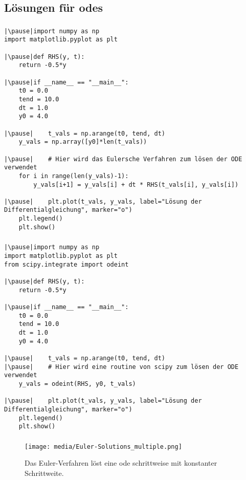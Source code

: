 \subsection{Lösungen für \acsp{ode}}
\label{subsec:solving}
\begin{frame}[fragile]
    \frametitle{\insertsubsection}
    \begin{verbatim}
|\pause|import numpy as np
import matplotlib.pyplot as plt

|\pause|def RHS(y, t):
    return -0.5*y

|\pause|if __name__ == "__main__":
    t0 = 0.0
    tend = 10.0
    dt = 1.0
    y0 = 4.0

|\pause|    t_vals = np.arange(t0, tend, dt)
    y_vals = np.array([y0]*len(t_vals))

|\pause|    # Hier wird das Eulersche Verfahren zum lösen der ODE verwendet
    for i in range(len(y_vals)-1):
        y_vals[i+1] = y_vals[i] + dt * RHS(t_vals[i], y_vals[i])

|\pause|    plt.plot(t_vals, y_vals, label="Lösung der Differentialgleichung", marker="o")
    plt.legend()
    plt.show()
	\end{verbatim}
\end{frame}


\begin{frame}[fragile]
    \frametitle{\insertsubsection}
    \begin{verbatim}
|\pause|import numpy as np
import matplotlib.pyplot as plt
from scipy.integrate import odeint

|\pause|def RHS(y, t):
    return -0.5*y

|\pause|if __name__ == "__main__":
    t0 = 0.0
    tend = 10.0
    dt = 1.0
    y0 = 4.0

|\pause|    t_vals = np.arange(t0, tend, dt)
|\pause|    # Hier wird eine routine von scipy zum lösen der ODE verwendet
    y_vals = odeint(RHS, y0, t_vals)

|\pause|    plt.plot(t_vals, y_vals, label="Lösung der Differentialgleichung", marker="o")
    plt.legend()
    plt.show()
	\end{verbatim}
\end{frame}


\begin{frame}
    \frametitle{\insertsubsection}
    \begin{figure}
        \centering
        \texttt{[image: media/Euler-Solutions\_multiple.png]}
        \caption{Das Euler-Verfahren löst eine \ac{ode} schrittweise mit konstanter Schrittweite.}
    \end{figure}
\end{frame}


